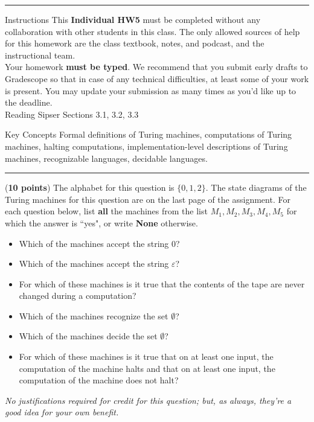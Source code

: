 \documentclass[10pt,letterpaper,unboxed,cm]{hmcpset}
\begin{document}
\begin{center}
\begin{minipage}[t]{5.7in}
\rule{\linewidth}{2pt}
{\sc Instructions}\newline
This {\bf Individual HW5} must be completed without any collaboration
with other students in this class.  The only allowed sources of help for this homework 
are the class textbook, notes, and podcast, and the instructional team.\\


Your homework {\bf must be typed}.  We recommend that you submit early drafts to Gradescope so that in 
case of any technical difficulties, at least some of your work is present.  You may update
your submission as many times as you'd like up to the deadline.\\


{\sc Reading} Sipser Sections 3.1, 3.2, 3.3
\newline

{\sc Key Concepts} Formal definitions of Turing machines, computations of Turing machines,
halting computations, implementation-level descriptions of Turing machines, recognizable languages, decidable languages.\newline

\rule{\linewidth}{2pt}
\end{minipage} \hfill

\end{center}

\problemlist{}



\begin{problem}[1.]({\bf 10 points}) The alphabet for this question is $\{0,1,2\}$. The state diagrams of the Turing machines for this question are on the last page
of the assignment. For each question below, list {\bf all} the machines from the list $M_1, M_2, 
M_3, M_4, M_5$ for which the answer is ``yes", or write {\bf None} otherwise.
\begin{itemize}
\item[a.] Which of the machines accept the string $0$?
\item[b.] Which of the machines accept the string $\varepsilon$?
\item[c.] For which of these machines is it true that the contents of the tape are never changed during a computation?
\item[d.] Which of the machines recognize the set $\emptyset$?
\item[e.] Which of the machines decide the set $\emptyset$?
\item[f.] For which of these machines is it true that on at least one input, the computation of the machine halts
and that on at least one input, the computation of the machine does not halt?
\end{itemize}



{\it No justifications required for credit for this question; but, as always, they're a good idea for your own benefit.}
\end{problem}
\end{document}
